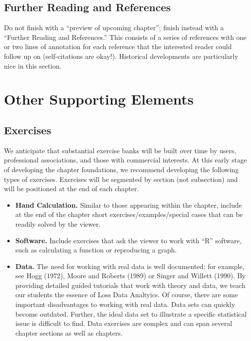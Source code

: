 \documentclass[]{book}
\providecommand{\tightlist}{%
  \setlength{\itemsep}{0pt}\setlength{\parskip}{0pt}}
\theoremstyle{definition}
\theoremstyle{definition}
\theoremstyle{definition}
\theoremstyle{remark}
\begin{document}
\subsection{Further Reading and
References}\label{further-reading-and-references}

Do not finish with a ``preview of upcoming chapter''; finish instead
with a ``Further Reading and References.'' This consists of a series of
references with one or two lines of annotation for each reference that
the interested reader could follow up on (self-citations are okay!).
Historical developments are particularly nice in this section.

\section{Other Supporting Elements}\label{other-supporting-elements}

\subsection{Exercises}\label{exercises}

We anticipate that substantial exercise banks will be built over time by
users, professional associations, and those with commercial interests.
At this early stage of developing the chapter foundations, we recommend
developing the following types of exercises. Exercises will be segmented
by section (not subsection) and will be positioned at the end of each
chapter.

\begin{itemize}
\tightlist
\item
  \textbf{Hand Calculation.} Similar to those appearing within the
  chapter, include at the end of the chapter short
  exercises/examples/special cases that can be readily solved by the
  viewer.
\item
  \textbf{Software.} Include exercises that ask the viewer to work with
  ``R'' software, such as calculating a function or reproducing a graph.
\item
  \textbf{Data.} The need for working with real data is well documented;
  for example, see Hogg (1972), Moore and Roberts (1989) or Singer and
  Willett (1990). By providing detailed guided tutorials that work with
  theory and data, we teach our students the essence of Loss Data
  Analtyics. Of course, there are some important disadvantages to
  working with real data. Data sets can quickly become outdated.
  Further, the ideal data set to illustrate a specific statistical issue
  is difficult to find. Data exercises are complex and can span several
  chapter sections as well as chapters.
\end{itemize}
\end{document}
